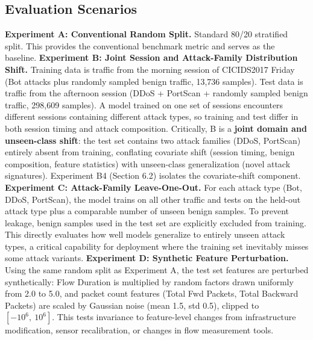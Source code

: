 \documentclass[10pt]{article}
\begin{document}
\subsection{Evaluation Scenarios}
\textbf{Experiment A: Conventional Random Split.} Standard 80/20 stratified split. This provides the conventional benchmark metric and serves as the baseline.
\textbf{Experiment B: Joint Session and Attack-Family Distribution Shift.} Training data is traffic from the morning session of CICIDS2017 Friday (Bot attacks plus randomly sampled benign traffic, 13,736 samples). Test data is traffic from the afternoon session (DDoS + PortScan + randomly sampled benign traffic, 298,609 samples). A model trained on one set of sessions encounters different sessions containing different attack types, so training and test differ in both session timing and attack composition. Critically, B is a \textbf{joint domain and unseen-class shift}: the test set contains two attack families (DDoS, PortScan) entirely absent from training, conflating covariate shift (session timing, benign composition, feature statistics) with unseen-class generalization (novel attack signatures). Experiment B4 (Section 6.2) isolates the covariate-shift component.
\textbf{Experiment C: Attack-Family Leave-One-Out.} For each attack type (Bot, DDoS, PortScan), the model trains on all other traffic and tests on the held-out attack type plus a comparable number of unseen benign samples. To prevent leakage, benign samples used in the test set are explicitly excluded from training. This directly evaluates how well models generalize to entirely unseen attack types, a critical capability for deployment where the training set inevitably misses some attack variants.
\textbf{Experiment D: Synthetic Feature Perturbation.} Using the same random split as Experiment A, the test set features are perturbed synthetically: Flow Duration is multiplied by random factors drawn uniformly from 2.0 to 5.0, and packet count features (Total Fwd Packets, Total Backward Packets) are scaled by Gaussian noise (mean 1.5, std 0.5), clipped to $[-10^{6},\ 10^{6}]$. This tests invariance to feature-level changes from infrastructure modification, sensor recalibration, or changes in flow measurement tools.
\end{document}

